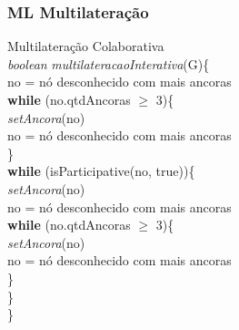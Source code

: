 \documentclass{beamer}
\begin{document}
\begin{frame}
\frametitle{\normalsize ML Multilateração}
\begin{flushleft}
	\vspace{-0.3cm}
	Multilateração Colaborativa\\
	\vspace{0.1cm}
	\textit{boolean} \textit{multilateracaoInterativa}(G)\{
	\\ \hspace{0.5cm} no = nó desconhecido com mais ancoras
	\\ \hspace{0.5cm} \textbf{while} (no.qtdAncoras $\geq$ 3)\{
	\\ \hspace{1.5cm} \textit{setAncora}(no)
	\\ \hspace{1.5cm} no = nó desconhecido com mais ancoras
	\\ \hspace{0.5cm} \}
	\\ \hspace{0.5cm} \textbf{while} (isParticipative(no, true))\{
	\\ \hspace{1.5cm} \textit{setAncora}(no)
	\\ \hspace{1.5cm} no = nó desconhecido com mais ancoras
	\\ \hspace{1.5cm} \textbf{while} (no.qtdAncoras $\geq$ 3)\{
	\\ \hspace{2.5cm} \textit{setAncora}(no)
	\\ \hspace{2.5cm} no = nó desconhecido com mais ancoras
	\\ \hspace{1.5cm} \}
	\\ \hspace{0.5cm} \}
	\\\}

\end{flushleft}
\end{frame}
\end{document}
